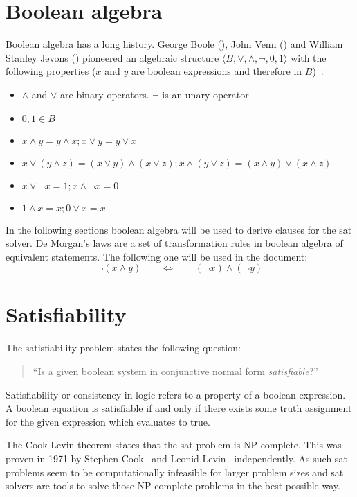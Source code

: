 \section{Boolean algebra}
\label{sec:boole}
%
Boolean algebra has a long history. George Boole (), John Venn () and William Stanley Jevons () pioneered an algebraic structure $\langle B, \lor, \land, \neg, 0, 1\rangle$ with the following properties ($x$ and $y$ are boolean expressions and therefore in $B$)~\cite[10]{Sat20}:
%
\begin{itemize}
  \item $\land$ and $\lor$ are binary operators. $\neg$ is an unary operator.
  \item $0, 1 \in B$
  \item $x \land y = y \land x; x \lor y = y \lor x$
  \item $x \lor (y \land z) = (x \lor y) \land (x \lor z); x \land (y \lor z) = (x \land y) \lor (x \land z)$
  \item $x \lor \neg x = 1; x \land \neg x = 0$
  \item $1 \land x = x; 0 \lor x = x$
\end{itemize}

In the following sections boolean algebra will be used to derive clauses for the \gls{sat} solver. De Morgan's laws are a set of transformation rules in boolean algebra of equivalent statements. The following one will be used in the document:
\[
  \neg (x \land y) \qquad\Leftrightarrow\qquad (\neg x) \land (\neg y)
\]

\section{Satisfiability}
\label{sec:sat}
%
The satisfiability problem states the following question:
\begin{quote}
  ``Is a given boolean system in conjunctive normal form \emph{satisfiable}?''
\end{quote}
%
Satisfiability or consistency in logic refers to a property of a boolean expression. A boolean equation is satisfiable if and only if there exists some truth assignment for the given expression which evaluates to true.

The Cook-Levin theorem states that the \gls{sat} problem is NP-complete. This was proven in 1971 by Stephen Cook~\cite{Sat01} and Leonid Levin~\cite{Sat02} independently. As such \gls{sat} problems seem to be computationally infeasible for larger problem sizes and \gls{sat} solvers are tools to solve those NP-complete problems in the best possible way.

